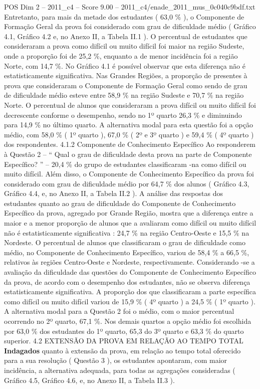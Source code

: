\begin{textsample}{POS Dim 2 – 2011\_c4 – Score 9.00 – 2011\_c4/enade\_2011\_mus\_0c040c9bdf.txt}
Entretanto, para mais da metade dos estudantes ( 63,0 \% ), o Componente de Formação Geral da prova foi considerado com grau de dificuldade médio ( Gráfico 4.1, Gráfico 4.2 e, no Anexo II, a Tabela II.1 ).
O percentual de estudantes que consideraram a prova como difícil ou muito difícil foi maior na região Sudeste, onde a proporção foi de 25,2 \%, enquanto a de menor incidência foi a região Norte, com 14,7 \%.
No Gráfico 4.1 é possível observar que esta diferença não é estatisticamente significativa.
Nas Grandes Regiões, a proporção de presentes à prova que consideraram o Componente de Formação Geral como sendo de grau de dificuldade médio esteve entre 58,9 \% na região Sudeste e 70,7 \% na região Norte.
O percentual de alunos que consideraram a prova difícil ou muito difícil foi decrescente conforme o desempenho, sendo no 1º quarto 26,3 \% e diminuindo para 14,9 \% no último quarto.
A alternativa modal para esta questão foi a opção médio, com 58,0 \% ( 1º quarto ), 67,0 \% ( 2º e 3º quarto ) e 59,4 \% ( 4º quarto ) dos respondentes. 4.1.2 Componente de Conhecimento Específico Ao responderem à Questão 2 – “ Qual o grau de dificuldade desta prova na parte de Componente Específico? ” – 20,4 \% do grupo de estudantes classificaram -na como difícil ou muito difícil.
Além disso, o Componente de Conhecimento Específico da prova foi considerado com grau de dificuldade médio por 64,7 \% dos alunos ( Gráfico 4.3, Gráfico 4.4, e, no Anexo II, a Tabela II.2 ).
A análise das respostas dos estudantes quanto ao grau de dificuldade do Componente de Conhecimento Específico da prova, agregado por Grande Região, mostra que a diferença entre a maior e a menor proporção de alunos que a avaliaram como difícil ou muito difícil não é estatisticamente significativa : 24,7 \% na região Centro-Oeste e 15,5 \% na Nordeste.
O percentual de alunos que classificaram o grau de dificuldade como médio, no Componente de Conhecimento Específico, variou de 58,4 \% a 66,5 \%, relativos às regiões Centro-Oeste e Nordeste, respectivamente.
Considerando -se a avaliação da dificuldade das questões do Componente de Conhecimento Específico da prova, de acordo com o desempenho dos estudantes, não se observa diferença estatisticamente significativa.
A proporção dos que classificaram a parte específica como difícil ou muito difícil variou de 15,9 \% ( 4º quarto ) a 24,5 \% ( 1º quarto ).
A alternativa modal para a Questão 2 foi o médio, com o maior percentual ocorrendo no 2º quarto, 67,1 \%.
Nos demais quartos a opção médio foi escolhida por 63,0 \% dos estudantes do 1º quarto, 65,3 do 3º quarto e 63,3 \% do quarto superior. 4.2 EXTENSÃO DA PROVA EM RELAÇÃO AO TEMPO TOTAL \textbf{Indagados} quanto à extensão da prova, em relação ao tempo total oferecido para a sua resolução ( Questão 3 ), os estudantes apontaram, com maior incidência, a alternativa adequada, para todas as agregações consideradas ( Gráfico 4.5, Gráfico 4.6, e, no Anexo II, a Tabela II.3 ).

\end{textsample}
